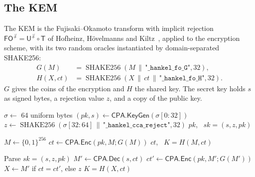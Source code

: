 \documentclass[11pt,a4paper]{article}
\theoremstyle{definition}
\newcommand{\SHAKE}{\operatorname{SHAKE256}}
\begin{document}
\subsection{The KEM}
The KEM is the Fujisaki--Okamoto transform with implicit rejection $\mathsf{FO}^{\not\perp} = \mathsf{U}^{\not\perp} \circ \mathsf{T}$ of Hofheinz, H\"ovelmanns and Kiltz~\cite{hhk2017modular}, applied to the encryption scheme, with its two random oracles instantiated by domain-separated SHAKE256:
\begin{align*}
G(M) &= \SHAKE(M \,\|\, \texttt{"\_hankel\_fo\_G"}, 32), \\
H(X, \mathit{ct}) &= \SHAKE(X \,\|\, \mathit{ct} \,\|\, \texttt{"\_hankel\_fo\_H"}, 32).
\end{align*}
$G$ gives the coins of the encryption and $H$ the shared key. The secret key holds $s$ as signed bytes, a rejection value $z$, and a copy of the public key.

\begin{algorithm}[H]
\caption{$\mathsf{KeyGen}()$}\label{alg:keygen}
\begin{algorithmic}[1]
\State $\sigma \gets$ 64 uniform bytes
\State $(\mathit{pk}, s) \gets \mathsf{CPA.KeyGen}(\sigma[0{:}32])$
\State $z \gets \SHAKE(\sigma[32{:}64] \,\|\, \texttt{"\_hankel\_cca\_reject"}, 32)$
\State \Return $\mathit{pk}$, \ $\mathit{sk} = (s, z, \mathit{pk})$
\end{algorithmic}
\end{algorithm}

\begin{algorithm}[H]
\caption{$\mathsf{Encaps}(\mathit{pk})$}\label{alg:encaps}
\begin{algorithmic}[1]
\State $M \gets \{0,1\}^{256}$
\State $\mathit{ct} \gets \mathsf{CPA.Enc}(\mathit{pk}, M; G(M))$
\State \Return $\mathit{ct}$, \ $K = H(M, \mathit{ct})$
\end{algorithmic}
\end{algorithm}

\begin{algorithm}[H]
\caption{$\mathsf{Decaps}(\mathit{sk}, \mathit{ct})$}\label{alg:decaps}
\begin{algorithmic}[1]
\State Parse $\mathit{sk} = (s, z, \mathit{pk})$
\State $M' \gets \mathsf{CPA.Dec}(s, \mathit{ct})$
\State $\mathit{ct}' \gets \mathsf{CPA.Enc}(\mathit{pk}, M'; G(M'))$
\State $X \gets M'$ if $\mathit{ct} = \mathit{ct}'$, else $z$ 
\State \Return $K = H(X, \mathit{ct})$
\end{algorithmic}
\end{algorithm}
\end{document}
